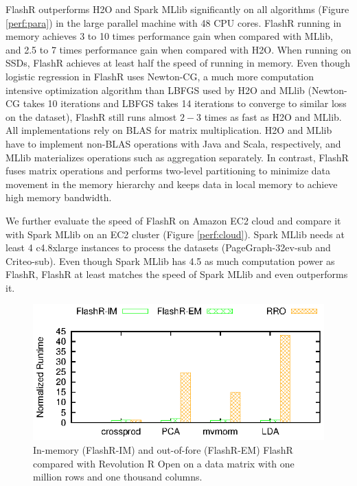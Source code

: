 FlashR outperforms H2O and Spark MLlib significantly on all algorithms
(Figure \ref{perf:para}) in the large parallel machine with 48 CPU cores.
FlashR running in memory achieves 3 to 10 times performance gain when compared
with MLlib, and 2.5 to 7 times performance gain when compared with H2O.
When running on SSDs, FlashR achieves at least half the speed of running in
memory. Even though logistic regression in FlashR uses Newton-CG, a much more
computation intensive optimization algorithm than LBFGS \cite{lbfgs} used by
H2O and MLlib (Newton-CG takes 10 iterations and LBFGS takes 14 iterations
to converge to similar loss on the dataset), FlashR still runs almost $2-3$
times as fast as H2O and MLlib. All implementations rely on BLAS for
matrix multiplication. H2O and MLlib have to
implement non-BLAS operations with Java and Scala, respectively, and
MLlib materializes operations such as aggregation separately. In contrast,
FlashR fuses matrix operations and performs two-level partitioning to
minimize data movement in the memory hierarchy and keeps data in local
memory to achieve high memory bandwidth.

We further evaluate the speed of FlashR on Amazon EC2 cloud and compare it with
Spark MLlib on an EC2 cluster (Figure \ref{perf:cloud}). Spark MLlib needs
at least 4 c4.8xlarge instances to process the datasets (PageGraph-32ev-sub
and Criteo-sub).
Even though Spark MLlib has 4.5 as much computation power as FlashR, FlashR
at least matches the speed of Spark MLlib and even outperforms it.

\begin{figure}[b]
  \vspace{-10pt}
	\begin{center}
		\footnotesize
		\includegraphics{FlashMatrix_figs/FlashR-vs-RRO.eps}
		\caption{In-memory (FlashR-IM) and out-of-fore (FlashR-EM) FlashR
		compared with Revolution R Open on a data matrix with one million rows
		and one thousand columns.}
		\label{fig:fmR}
	\end{center}
  \vspace{-15pt}
\end{figure}

